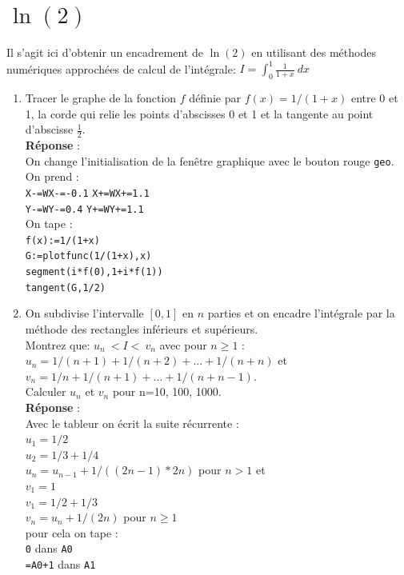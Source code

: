 \documentclass[a4paper,11pt]{book}
\begin{document}
\section{$\ln(2)$} \label{sec:ln2}
Il s'agit ici d'obtenir un encadrement de $\ln(2)$ en utilisant
des m\'ethodes num\'eriques approch\'ees de calcul de l'int\'egrale:
$\displaystyle I= \int _0^1 \frac{1}{1+x} \ dx$
\begin{enumerate}
\item Tracer le graphe de la fonction $f$ d\'efinie par
$f(x)=1/(1+x)$ entre 0 et 1, la corde qui relie les points d'abscisses 0 et 1 
et la tangente au point d'abscisse $\frac{1}{2}$.\\
{\bf R\'eponse} :\\
On change l'initialisation de la fen\^etre graphique avec le  bouton rouge 
{\tt geo}.
On prend :\\
{\tt X-=WX-=-0.1}
{\tt X+=WX+=1.1}\\
{\tt Y-=WY-=0.4}
{\tt Y+=WY+=1.1}\\
On tape :\\
{\tt f(x):=1/(1+x)}\\
{\tt G:=plotfunc(1/(1+x),x)}\\
{\tt segment(i*f(0),1+i*f(1))}\\
{\tt tangent(G,1/2)}
\item On subdivise l'intervalle $[0,1]$ en $n$ parties et on encadre 
l'int\'egrale par la m\'ethode des rectangles inf\'erieurs et sup\'erieurs.\\
Montrez que:
$u_n\ <I<\ v_n$  avec pour $n\geq 1$ :\\
$u_n=1/(n+1)+1/(n+2)+...+1/(n+n)$ et\\
$v_n= 1/n+1/(n+1)+...+1/(n+n-1)$.\\  
Calculer $u_n$ et $v_n$ pour n=10, 100, 1000.\\
{\bf R\'eponse} :\\
Avec le tableur on \'ecrit la suite r\'ecurrente :\\
$u_1=1/2$\\
$u_2=1/3+1/4$\\
$u_n=u_{n-1}+1/((2n-1)*2n)$ pour $n> 1$ et\\
$v_1=1$\\
$v_1=1/2+1/3 $\\
$v_n=u_n+1/(2n)$ pour $n\geq 1$\\
pour cela on tape :\\
{\tt 0} dans {\tt A0} \\ 
{\tt =A0+1} dans {\tt A1}\\

\end{enumerate}
\end{document}
